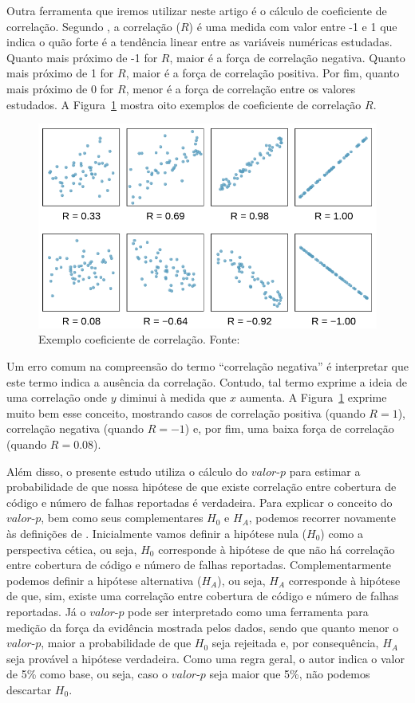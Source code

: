 \documentclass[11.5pt]{article}
\begin{document}
Outra ferramenta que iremos utilizar neste artigo é o cálculo de coeficiente de correlação.
Segundo \cite{openIntroStat}, a correlação ($R$) é uma medida com valor entre -1 e 1 que
indica o quão forte é a tendência linear entre as variáveis numéricas estudadas.
Quanto mais próximo de -1 for $R$, maior é a força de correlação negativa.
Quanto mais próximo de 1 for  $R$, maior é a força de correlação positiva.
Por fim, quanto mais próximo de 0 for $R$, menor é a força de correlação entre os valores
estudados. A Figura~\ref{fig:correlation_example} mostra oito exemplos de coeficiente de correlação
$R$.

\begin{figure}[ht]
    \centering
    \includegraphics[width=.7\textwidth]{correlation_example.png}
    \caption{Exemplo coeficiente de correlação. Fonte: \cite{openIntroStat}}
    \label{fig:correlation_example}
\end{figure}

Um erro comum na compreensão do termo ``correlação negativa'' é interpretar que este termo indica a
ausência da correlação.
Contudo, tal termo exprime a ideia de uma correlação onde $y$ diminui à medida que $x$ aumenta.
A Figura~\ref{fig:correlation_example} exprime muito bem esse conceito, mostrando casos de
correlação positiva (quando $R = 1$), correlação negativa (quando $R = -1$) e, por fim, uma baixa
força de correlação (quando $R = 0.08$).

Além disso, o presente estudo utiliza o cálculo do $valor\mbox{-}p$ para estimar a probabilidade de que
nossa hipótese de que existe correlação entre cobertura de código e número de falhas reportadas é
verdadeira.
Para explicar o conceito do $valor\mbox{-}p$, bem como seus complementares $H_0$ e $H_A$, podemos recorrer
novamente às definições de \cite{openIntroStat}.
Inicialmente vamos definir a hipótese nula ($H_0$) como a perspectiva cética, ou seja, $H_0$
corresponde à hipótese de que não há correlação entre cobertura de código e número de falhas
reportadas.
Complementarmente podemos definir a hipótese alternativa ($H_A$), ou seja, $H_A$ corresponde à
hipótese de que, sim, existe uma correlação entre cobertura de código e número de falhas reportadas.
Já o $valor\mbox{-}p$ pode ser interpretado como uma ferramenta para medição da força da evidência
mostrada pelos dados, sendo que quanto menor o $valor\mbox{-}p$, maior a probabilidade de que $H_0$
seja rejeitada e, por consequência, $H_A$ seja provável a hipótese verdadeira.
Como uma regra geral, o autor indica o valor de 5\% como base, ou seja, caso o $valor\mbox{-}p$ seja
maior que 5\%, não podemos descartar $H_0$.
\end{document}
